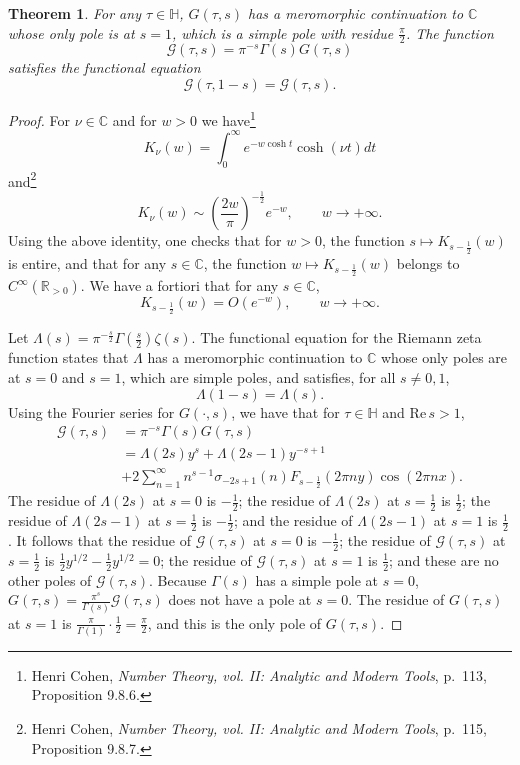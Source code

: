 \documentclass{article}
\def\Re{\ensuremath{\mathrm{Re}}\,}
\newtheorem{theorem}{Theorem}
\theoremstyle{definition}
\begin{document}
\begin{theorem}
For any $\tau \in \mathbb{H}$, $G(\tau,s)$ has a meromorphic continuation to $\mathbb{C}$ whose only pole is at $s=1$, which is a simple pole with residue
$\frac{\pi}{2}$. The function
\[
\mathcal{G}(\tau,s) = \pi^{-s} \Gamma(s) G(\tau,s)
\]
satisfies the functional equation
\[
\mathcal{G}(\tau,1-s) = \mathcal{G}(\tau,s).
\]
\label{Gfunctional}
\end{theorem}
\begin{proof}
For $\nu \in \mathbb{C}$
and for $w>0$ we have\footnote{Henri Cohen, {\em Number Theory, vol. II: Analytic and Modern Tools}, p.~113, Proposition 9.8.6.}
\[
K_\nu(w) = \int_0^\infty e^{-w\cosh t} \cosh(\nu t) dt
\]
and\footnote{Henri Cohen, {\em Number Theory, vol. II: Analytic and Modern Tools}, p.~115, Proposition 9.8.7.}
\[
K_\nu(w) \sim \left(\frac{2w}{\pi}\right)^{-\frac{1}{2}} e^{-w}, \qquad w \to +\infty.
\]
Using the above identity, one checks that for $w>0$, the function $s \mapsto K_{s-\frac{1}{2}}(w)$ is entire, and that
for any $s \in \mathbb{C}$, the function $w \mapsto K_{s-\frac{1}{2}}(w)$ belongs to $C^\infty(\mathbb{R}_{>0})$.
We have a fortiori that for any $s \in \mathbb{C}$,
\[
K_{s-\frac{1}{2}}(w) = O(e^{-w}), \qquad w \to +\infty.
\]

Let $\Lambda(s)=\pi^{-\frac{s}{2}} \Gamma\left(\frac{s}{2}\right) \zeta(s)$. The functional equation for the Riemann zeta function
states that $\Lambda$ has a meromorphic continuation to $\mathbb{C}$ whose only poles are at $s=0$ and $s=1$, which are simple poles,
and satisfies, for all $s \neq 0,1$,
\[
\Lambda(1-s)=\Lambda(s).
\]
Using the Fourier series for $G(\cdot,s)$, we have that for $\tau \in \mathbb{H}$ and $\Re s>1$,
\begin{align*}
\mathcal{G}(\tau,s)&= \pi^{-s} \Gamma(s) G(\tau,s)\\
&=\Lambda(2s) y^s + \Lambda(2s-1) y^{-s+1}\\
&+2\sum_{n=1}^\infty n^{s-1} \sigma_{-2s+1}(n) F_{s-\frac{1}{2}}(2\pi ny) \cos(2\pi nx).
\end{align*}
The residue of $\Lambda(2s)$ at $s=0$ is $-\frac{1}{2}$;
the residue of $\Lambda(2s)$ at $s=\frac{1}{2}$ is $\frac{1}{2}$;
the residue of $\Lambda(2s-1)$ at $s=\frac{1}{2}$ is $-\frac{1}{2}$;
and the residue of $\Lambda(2s-1)$ at $s=1$ is $\frac{1}{2}$. It follows that 
the residue of $\mathcal{G}(\tau,s)$ at $s=0$ is $-\frac{1}{2}$; the residue of $\mathcal{G}(\tau,s)$ at
$s=\frac{1}{2}$ is $\frac{1}{2}y^{1/2}-\frac{1}{2}y^{1/2}=0$;
 the residue of $\mathcal{G}(\tau,s)$ at $s=1$ is $\frac{1}{2}$; and these are no other poles of $\mathcal{G}(\tau,s)$. 
Because $\Gamma(s)$ has a simple pole at $s=0$, $G(\tau,s)  = \frac{\pi^s}{\Gamma(s)} \mathcal{G}(\tau,s)$
does not have a pole at $s=0$. The residue of $G(\tau,s)$ at $s=1$ is
$\frac{\pi}{\Gamma(1)} \cdot \frac{1}{2}=\frac{\pi}{2}$, and this is the only pole of $G(\tau,s)$. 


\end{proof}
\end{document}
